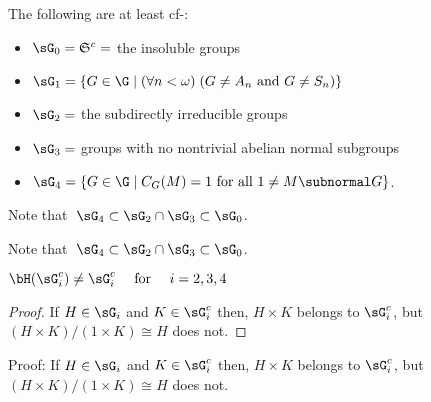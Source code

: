 \begin{frame}[label=IEPropsPrezi]{}
The following are at least cf-\IE: 
\vskip5mm
\begin{itemize}
\item $\sG_0 = \mathfrak{S}^c = $ the insoluble groups
\vskip2mm
\item $\sG_1 =\{G\in \G \mid (\forall n<\omega) \; (G \neq A_n \text{ and }  G\neq S_n) \}$
\vskip2mm
\item $\sG_2 = $ the subdirectly irreducible groups
\vskip2mm
\item $\sG_3 = $ groups with no nontrivial abelian normal subgroups
\vskip2mm
\item $\sG_4 = \{G\in \G \mid C_G(M) = 1 \text{ for all } 1\neq M\subnormal G\}$.
\end{itemize}
\end{frame}
\begin{frame}[label=IEPropsPreziAlt2]{}
\begin{center}
\vskip-4cm
Note that $\;\sG_4 \subset \sG_2\cap \sG_3 \subset \sG_0$.
\end{center}
\end{frame}

\begin{frame}[label=IEPropsPrezi]{}
\begin{center}
Note that $\;\sG_4 \subset \sG_2\cap \sG_3 \subset \sG_0$.
\end{center}
\vskip3cm
\begin{center}
$\bH(\sG_i^c) \neq \sG_i^c \quad \text{ for } \quad i= 2, 3, 4$
\end{center}
\end{frame}

\begin{frame}[label=IEPropsPrezi]{}
\begin{proof}
If $H\in \sG_i$ and $K\in \sG_i^c$ then,
$H\times K$ belongs to $\sG_i^c$, but
$(H\times K)/(1\times K) \cong H$ does not.
\end{proof}
\end{frame}

\begin{frame}[label=IEPropsPrezi]{}

\alert{Proof:}
\vskip4mm
 If $H\in \sG_i$ and $K\in \sG_i^c$ then,
\vskip4mm
$H\times K$ belongs to $\sG_i^c$, but
\vskip4mm
$(H\times K)/(1\times K) \cong H$ does not.

\end{frame}

